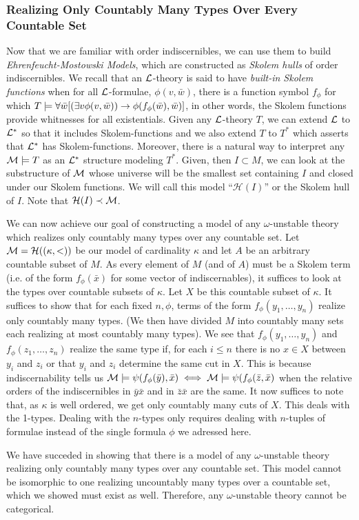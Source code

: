 \subsubsection{Realizing Only Countably Many Types Over Every Countable Set}
Now that we are familiar with order indiscernibles, we can use them to build \textit{Ehrenfeucht-Mostowski Models}, which are constructed as \textit{Skolem hulls} of order indiscernibles. 
We recall that an \(\mathcal{L}\)-theory is said to have \textit{built-in Skolem functions} when for all \(\mathcal{L}\)-formulae, \(\phi(v, \bar{w})\), there is a function symbol \(f_\phi\) for which 
\(T \models \forall \bar{w} [(\exists v \phi(v, \bar{w})) \to \phi(f_\phi(\bar{w}), \bar{w})]\), in other words, the Skolem functions provide whitnesses for all existentials. 
Given any \(\mathcal{L}\)-theory \(T\), we can extend \(\mathcal{L}\) to \(\mathcal{L}^*\) so that it includes Skolem-functions and we also extend \(T\) to \(T^*\) which asserts that \(\mathcal{L}^*\) has Skolem-functions. 
Moreover, there is a natural way to interpret any \(\mathcal{M} \models T\) as an \(\mathcal{L}^*\) structure modeling \(T^*\).
Given, then \(I \subset M\), we can look at the substructure of \(\mathcal{M}\) whose universe will be the smallest set containing \(I\) and closed under our Skolem functions. 
We will call this model ``\(\mathcal{H}(I)\)'' or the Skolem hull of \(I\).
Note that \(\mathcal{H}(I) \prec \mathcal{M}\).

We can now achieve our goal of constructing a model of any \(\omega\)-unstable theory which realizes only countably many types over any countable set. 
Let \(\mathcal{M} = \mathcal{H}((\kappa, <))\) be our model of cardinality \(\kappa\) and let \(A\) be an arbitrary countable subset of \(M\). 
As every element of \(M\) (and of \(A\)) must be a Skolem term (i.e. of the form \(f_\phi(\bar{x})\) for some vector of indiscernables), it suffices to look at the types over countable subsets of \(\kappa\).
Let \(X\) be this countable subset of \(\kappa\). 
It suffices to show that for each fixed \(n, \phi\), terms of the form \(f_\phi(y_1, \ldots, y_n)\) realize only countably many types. 
(We then have divided \(M\) into countably many sets each realizing at most countably many types).
We see that \(f_\phi(y_1, \ldots, y_n)\) and \(f_\phi(z_1, \ldots, z_n)\) realize the same type if, for each \(i \leq n\) there is no \(x \in X\) between \(y_i\) and \(z_i\) or that \(y_i\) and \(z_i\) determine the same cut in \(X\).  
This is because indiscernability tells us \(\mathcal{M} \models \psi(f_\phi(\bar{y}), \bar{x}) \iff \mathcal{M} \models \psi(f_\phi(\bar{z}, \bar{x})\) when the relative orders of the indiscernibles in \(\bar{y}\bar{x}\) and in \(\bar{z}\bar{x}\) are the same. 
It now suffices to note that, as \(\kappa\) is well ordered, we get only countably many cuts of \(X\). 
This deals with the 1-types. Dealing with the \(n\)-types only requires dealing with \(n\)-tuples of formulae instead of the single formula \(\phi\) we adressed here. 

We have succeded in showing that there is a model of any \(\omega\)-unstable theory realizing only countably many types over any countable set.
This model cannot be isomorphic to one realizing uncountably many types over a countable set, which we showed must exist as well. 
Therefore, any \(\omega\)-unstable theory cannot be categorical.
